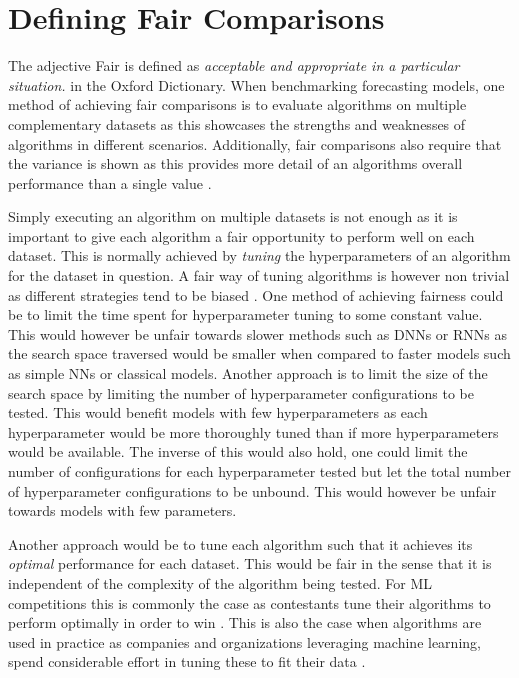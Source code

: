\section{Defining Fair Comparisons}
\label{sec:fair_comparisons}
The adjective Fair is defined as \textit{acceptable and appropriate in a particular situation.} in the Oxford Dictionary. When benchmarking forecasting models, one method of achieving fair comparisons is to evaluate algorithms on multiple complementary datasets as this showcases the strengths and weaknesses of algorithms in different scenarios. Additionally, fair comparisons also require that the variance is shown as this provides more detail of an algorithms overall performance than a single value \cite{bouthillier2021accounting}.

Simply executing an algorithm on multiple datasets is not enough as it is important to give each algorithm a fair opportunity to perform well on each dataset. This is normally achieved by \textit{tuning} the hyperparameters of an algorithm for the dataset in question. A fair way of tuning algorithms is however non trivial as different strategies tend to be biased \cite{sivaprasad2020optimizer}. One method of achieving fairness could be to limit the time spent for hyperparameter tuning to some constant value. This would however be unfair towards slower methods such as DNNs or RNNs as the search space traversed would be smaller when compared to faster models such as simple NNs or classical models. Another approach is to limit the size of the search space by limiting the number of hyperparameter configurations to be tested. This would benefit models with few hyperparameters as each hyperparameter would be more thoroughly tuned than if more hyperparameters would be available. The inverse of this would also hold, one could limit the number of configurations for each hyperparameter tested but let the total number of hyperparameter configurations to be unbound. This would however be unfair towards models with few parameters.

Another approach would be to tune each algorithm such that it achieves its \textit{optimal} performance for each dataset. This would be fair in the sense that it is independent of the complexity of the algorithm being tested. For ML competitions this is commonly the case as contestants tune their algorithms to perform optimally in order to win \cite{roelofs2019meta}. This is also the case when algorithms are used in practice as companies and organizations leveraging machine learning, spend considerable effort in tuning these to fit their data \cite{beam2020challenges}.

